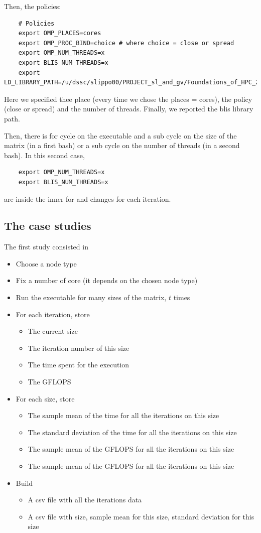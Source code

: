 \documentclass{article}
\begin{document}
Then, the policies:
\begin{verbatim}
    # Policies
    export OMP_PLACES=cores
    export OMP_PROC_BIND=choice # where choice = close or spread
    export OMP_NUM_THREADS=x
    export BLIS_NUM_THREADS=x
    export LD_LIBRARY_PATH=/u/dssc/slippo00/PROJECT_sl_and_gv/Foundations_of_HPC_2022/Assignment/exercise2/blis/lib/skx:$LD_LIBRARY_PATH
\end{verbatim}
Here we specified thee place (every time we chose the places = cores), the policy (close or spread) and the number of threads. Finally, we reported the blis library path.

Then, there is for cycle on the executable and a sub cycle on the size of the matrix (in a first bash) or a sub cycle on the number of threads (in a second bash). In this second case, 
\begin{verbatim}
    export OMP_NUM_THREADS=x
    export BLIS_NUM_THREADS=x
\end{verbatim}
are inside the inner for and changes for each iteration. 

\subsection{The case studies}
The first study consisted in 
\begin{itemize}
    \item Choose a node type
    \item Fix a number of core (it depends on the chosen node type)
    \item Run the executable for many sizes of the matrix, $t$ times 
    \item For each iteration, store
    \begin{itemize}
        \item The current size 
        \item The iteration number of this size
        \item The time spent for the execution
        \item The GFLOPS
    \end{itemize}
    \item For each size, store
        \begin{itemize}
            \item The sample mean of the time for all the iterations on this size
            \item The standard deviation of the time for all the iterations on this size
            \item The sample mean of the GFLOPS for all the iterations on this size
            \item The sample mean of the GFLOPS for all the iterations on this size
        \end{itemize}
    \item Build
    \begin{itemize}
        \item A csv file with all the iterations data 
        \item A csv file with size, sample mean for this size, standard deviation for this size 
    \end{itemize}
\end{itemize}
\end{document}
